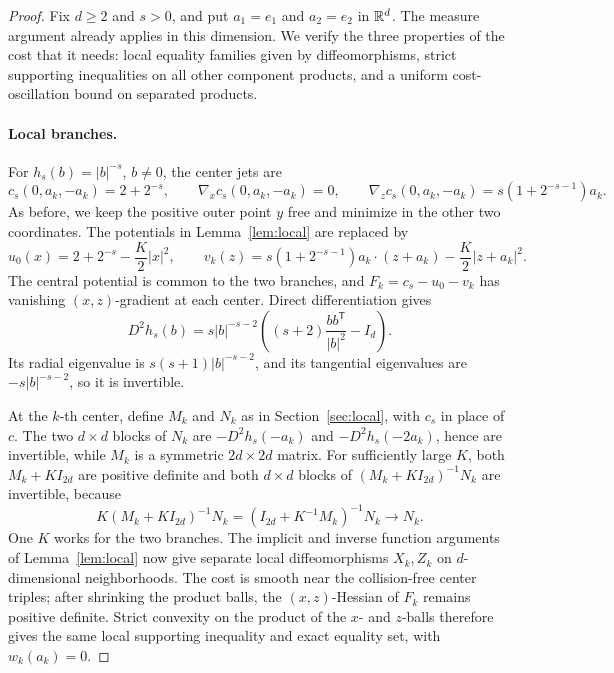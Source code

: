 \begin{proof}
Fix \(d\ge2\) and \(s>0\), and put \(a_1=e_1\) and \(a_2=e_2\)
in \(\mathbb R^d\). The measure argument already applies in this dimension.
We verify the three properties of the cost that it needs: local
equality families given by diffeomorphisms, strict supporting
inequalities on all other component products, and a uniform
cost-oscillation bound on separated products.

\paragraph{Local branches.}
For \(h_s(b)=|b|^{-s}\), \(b\ne0\), the center jets are
\[
 c_s(0,a_k,-a_k)=2+2^{-s},\qquad
 \nabla_xc_s(0,a_k,-a_k)=0,\qquad
 \nabla_zc_s(0,a_k,-a_k)=s(1+2^{-s-1})a_k.
\]
As before, we keep the positive outer point \(y\) free and minimize
in the other two coordinates. The potentials in Lemma~\ref{lem:local}
are replaced by
\[
 u_0(x)=2+2^{-s}-\frac K2|x|^2,\qquad
 v_k(z)=s(1+2^{-s-1})a_k\cdot(z+a_k)-\frac K2|z+a_k|^2.
\]
The central potential is common to the two branches, and
\(F_k=c_s-u_0-v_k\) has vanishing \((x,z)\)-gradient at each center.
Direct differentiation gives
\[
 D^2h_s(b)=s|b|^{-s-2}
 \left((s+2)\frac{bb^{\mathsf T}}{|b|^2}-I_d\right).
\]
Its radial eigenvalue is \(s(s+1)|b|^{-s-2}\), and its tangential
eigenvalues are \(-s|b|^{-s-2}\), so it is invertible.

At the \(k\)-th center, define \(M_k\) and \(N_k\) as in
Section~\ref{sec:local}, with \(c_s\) in place of \(c\).
The two \(d\times d\) blocks of \(N_k\) are
\(-D^2h_s(-a_k)\) and \(-D^2h_s(-2a_k)\), hence are invertible,
while \(M_k\) is a symmetric \(2d\times2d\) matrix. For sufficiently
large \(K\), both \(M_k+KI_{2d}\) are positive definite and both
\(d\times d\) blocks of \((M_k+KI_{2d})^{-1}N_k\) are invertible, because
\[
 K(M_k+KI_{2d})^{-1}N_k
 =(I_{2d}+K^{-1}M_k)^{-1}N_k\longrightarrow N_k.
\]
One \(K\) works for the two branches. The implicit and inverse function
arguments of Lemma~\ref{lem:local} now give separate local
diffeomorphisms \(X_k,Z_k\) on \(d\)-dimensional neighborhoods.
The cost is smooth near the collision-free center triples; after
shrinking the product balls, the \((x,z)\)-Hessian of \(F_k\) remains positive
definite. Strict convexity on the product of the \(x\)- and \(z\)-balls
therefore gives the same local supporting inequality and exact equality
set, with \(w_k(a_k)=0\).


\end{proof}
